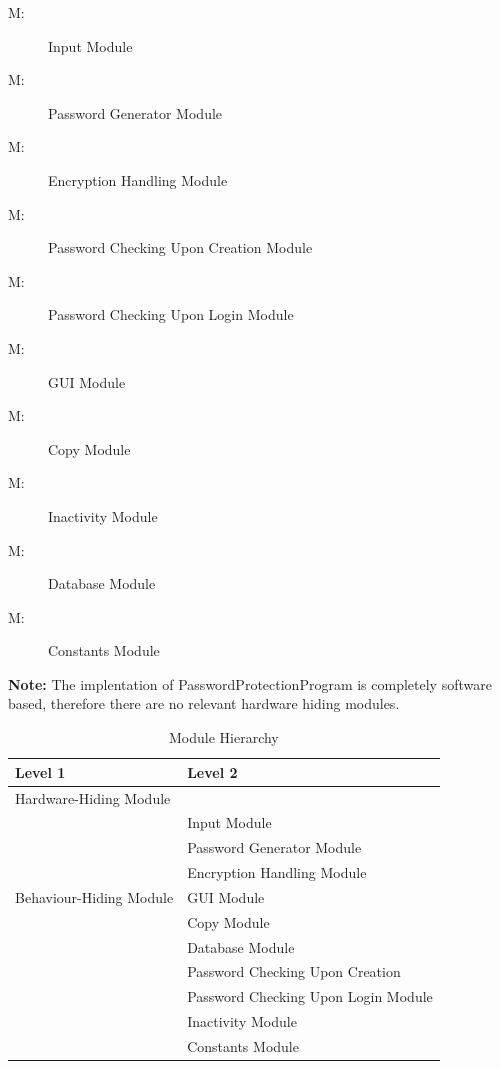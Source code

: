 \documentclass[12pt, titlepage]{article}
\newcounter{mnum}
\newcommand{\mthemnum}{M\themnum}
\begin{document}
\begin{description}
  \item [ \mthemnum \label{mIn}:] Input Module
  \item [ \mthemnum \label{mPG}:] Password Generator Module
  \item [ \mthemnum \label{mEH}:] Encryption Handling Module
  \item [ \mthemnum \label{mPCUC}:] Password Checking Upon Creation Module
  \item [ \mthemnum \label{mPCUL}:] Password Checking Upon Login Module
  \item [ \mthemnum \label{mGUI}:] GUI Module
  \item [ \mthemnum \label{mCop}:] Copy Module
  \item [ \mthemnum \label{mInac}:] Inactivity Module
  \item [ \mthemnum \label{mDB}:] Database Module
  \item [ \mthemnum \label{mCons}:] Constants Module

\end{description}

\textbf{Note:} The implentation of PasswordProtectionProgram is completely software based, therefore there are no relevant hardware hiding modules.

\begin{table}[h!]
\centering
\begin{tabular}{p{} p{}}
\toprule
\textbf{Level 1} & \textbf{Level 2}\\
\midrule

{Hardware-Hiding Module} & ~ \\
\midrule

\multirow{7}{0.3\textwidth}{Behaviour-Hiding Module} 
& Input Module\\
& Password Generator Module\\
& Encryption Handling Module\\
& GUI Module\\
& Copy Module\\
& Database Module\\ 
\midrule

\multirow{3}{0.3\textwidth}{Software Decision Module} 
& Password Checking Upon Creation\\
& Password Checking Upon Login Module\\
& Inactivity Module\\
& Constants Module\\
\bottomrule

\end{tabular}
\caption{Module Hierarchy}
\label{TblMH}
\end{table}
\end{document}

